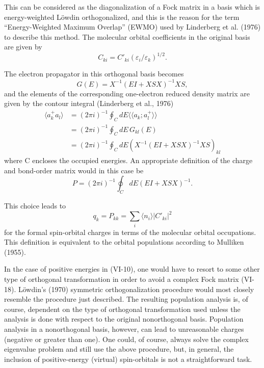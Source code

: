 \documentclass[12pt,letterpaper]{report}
\begin{document}
This can be considered as the diagonalization of a Fock matrix in a basis which is energy-weighted Löwdin orthogonalized, and this is the reason for the term ``Energy-Weighted Maximum Overlap'' (EWMO) used by Linderberg et al. (1976) to describe this method. The molecular orbital coefficients in the original basis are given by
\begin{equation}
C_{ki} = C'_{ki}(\varepsilon_i/\varepsilon_k)^{1/2}.
\end{equation}

The electron propagator in this orthogonal basis becomes
\begin{equation}
G(E) = X^{-1}(EI + XSX)^{-1}XS,
\end{equation}
and the elements of the corresponding one-electron reduced density matrix are given by the contour integral (Linderberg et al., 1976)
\begin{align}
\langle a_k^+ a_l \rangle &= (2\pi i)^{-1} \oint_C dE \langle\langle a_k ; a_l^+ \rangle\rangle \nonumber\\
&= (2\pi i)^{-1} \oint_C dE \, G_{kl}(E) \nonumber\\
&= (2\pi i)^{-1} \oint_C dE (X^{-1}(EI + XSX)^{-1}XS)_{kl}
\end{align}
where C encloses the occupied energies. An appropriate definition of the charge and bond-order matrix would in this case be
\begin{equation}
P = (2\pi i)^{-1} \oint_C dE (EI + XSX)^{-1}.
\end{equation}

This choice leads to
\begin{equation}
q_k = P_{kk} = \sum_i \langle n_i \rangle |C'_{ki}|^2
\end{equation}
for the formal spin-orbital charges in terms of the molecular orbital occupations. This definition is equivalent to the orbital populations according to Mulliken (1955).

In the case of positive energies in (VI-10), one would have to resort to some other type of orthogonal transformation in order to avoid a complex Fock matrix (VI-18). Löwdin's (1970) symmetric orthogonalization procedure would most closely resemble the procedure just described. The resulting population analysis is, of course, dependent on the type of orthogonal transformation used unless the analysis is done with respect to the original nonorthogonal basis. Population analysis in a nonorthogonal basis, however, can lead to unreasonable charges (negative or greater than one). One could, of course, always solve the complex eigenvalue problem and still use the above procedure, but, in general, the inclusion of positive-energy (virtual) spin-orbitals is not a straightforward task.
\end{document}

